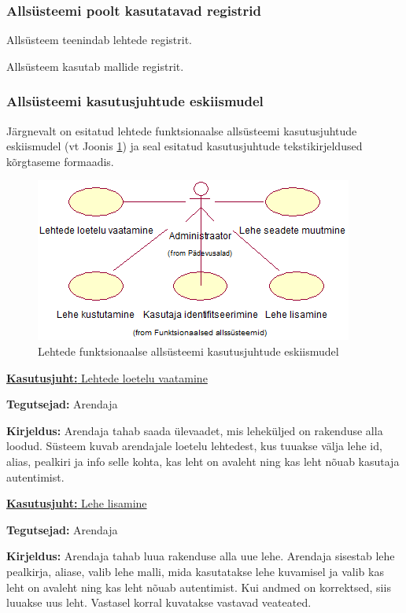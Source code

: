 \documentclass[a4paper,12pt]{article} %
\begin{document}
\subsubsection{Allsüsteemi poolt kasutatavad registrid}
Allsüsteem teenindab lehtede registrit.\par
Allsüsteem kasutab mallide registrit.
\subsubsection{Allsüsteemi kasutusjuhtude eskiismudel}
Järgnevalt on esitatud lehtede funktsionaalse allsüsteemi kasutusjuhtude eskiismudel (vt Joonis \ref{fig_lehtede_funktsionaalse_allsüsteemi_kasutusjuhtude_eskiismudel}) ja seal esitatud kasutusjuhtude tekstikirjeldused kõrgtaseme formaadis.
\begin{figure}[H]
\begin{center}
\includegraphics[bb=0 0 395 203,scale=1]{./diagrams/pages-subsystem-use-case-digram.png}
\caption{Lehtede funktsionaalse allsüsteemi kasutusjuhtude eskiismudel}
\label{fig_lehtede_funktsionaalse_allsüsteemi_kasutusjuhtude_eskiismudel}
\end{center}
\end{figure}

\underline{\textbf{Kasutusjuht:} Lehtede loetelu vaatamine}
\par
\textbf{Tegutsejad:} Arendaja
\par
\textbf{Kirjeldus:} Arendaja tahab saada ülevaadet, mis leheküljed on rakenduse alla loodud. Süsteem kuvab arendajale loetelu lehtedest, kus tuuakse välja lehe id, alias, pealkiri ja info selle kohta, kas leht on avaleht ning kas leht nõuab kasutaja autentimist.
\par

\underline{\textbf{Kasutusjuht:} Lehe lisamine}
\par
\textbf{Tegutsejad:} Arendaja
\par
\textbf{Kirjeldus:} Arendaja tahab luua rakenduse alla uue lehe. Arendaja sisestab lehe pealkirja, aliase, valib lehe malli, mida kasutatakse lehe kuvamisel ja valib kas leht on avaleht ning kas leht nõuab autentimist. Kui andmed on korrektsed, siis luuakse uus leht. Vastasel korral kuvatakse vastavad veateated.
\par
\end{document}
